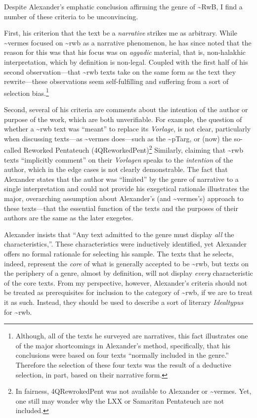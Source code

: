 Despite Alexander's emphatic conclusion affirming the genre of
\textasciitilde{}RwB, I find a number of these criteria to be
unconvincing.

First, his criterion that the text be a \emph{narrative} strikes me as
arbitrary. While \textasciitilde{}vermes focused on \textasciitilde{}rwb
as a narrative phenomenon, he has since noted that the reason for this
was that his focus was on \emph{aggadic} material, that is, non-halakhic
interpretation, which by definition is non-legal. Coupled with the first
half of his second observation---that \textasciitilde{}rwb texts take on
the same form as the text they rewrite---these observations seem
self-fulfilling and suffering from a sort of selection bias.\footnote{Although,
  all of the texts he surveyed are narratives, this fact illustrates one
  of the major shortcomings in Alexander's method, specifically, that
  his conclusions were based on four texts ``normally included in the
  genre.''\autocite[99]{alexander_carson-williamson1988} Therefore the
  selection of these four texts was the result of a deductive selection,
  in part, based on their narrative form.}

Second, several of his criteria are comments about the intention of the
author or purpose of the work, which are both unverifiable. For example,
the question of whether a \textasciitilde{}rwb text was ``meant'' to
replace its \emph{Vorlage}, is not clear, particularly when discussing
texts---as \textasciitilde{}vermes does---such as the
\textasciitilde{}pTarg, or (now) the so-called Reworked Pentateuch
(4QReworkedPent)\footnote{In fairness, 4QRewrokedPent was not available
  to Alexander or \textasciitilde{}vermes. Yet, one still may wonder why
  the LXX or Samaritan Pentateuch are not included.} Similarly, claiming
that \textasciitilde{}rwb texts ``implicitly comment'' on their
\emph{Vorlagen} speaks to the \emph{intention} of the author, which in
the edge cases is not clearly demonstrable. The fact that Alexander
states that the author was ``limited'' by the genre of narrative to a
single interpretation and could not provide his exegetical rationale
illustrates the major, overarching assumption about Alexander's (and
\textasciitilde{}vermes's) approach to these texts---that the essential
function of the texts and the purposes of their authors are the same as
the later exegetes.

Alexander insists that ``Any text admitted to the genre must display
\emph{all} the characteristics,''\autocite[119 n.
11]{alexander_carson-williamson1988}. These characteristics were
inductively identified, yet Alexander offers no formal rationale for
selecting his sample. The texts that he selects, indeed, represent the
\emph{core} of what is generally accepted to be \textasciitilde{}rwb,
but texts on the periphery of a genre, almost by definition, will not
display \emph{every} characteristic of the core texts. From my
perspective, however, Alexander's criteria should not be treated as
prerequisites for inclusion to the category of \textasciitilde{}rwb, if
we are to treat it as such. Instead, they should be used to describe a
sort of literary \emph{Idealtypus} for \textasciitilde{}rwb.

